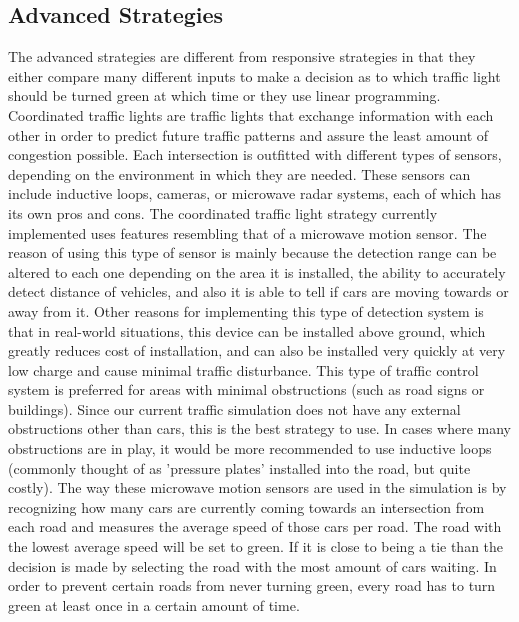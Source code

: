 \documentclass[10pt]{article}
\begin{document}
\subsection{Advanced Strategies}
The advanced strategies are different from responsive strategies in that they either compare many different inputs to make a decision as to which traffic light should be turned green at which time or they use linear programming. Coordinated traffic lights are traffic lights that exchange information with each other in order to predict future traffic patterns and assure the least amount of congestion possible. Each intersection is outfitted with different types of sensors, depending on the environment in which they are needed. These sensors can include inductive loops, cameras, or microwave radar systems, each of which has its own pros and cons. The coordinated traffic light strategy currently implemented uses features resembling that of a microwave motion sensor. The reason of using this type of sensor is mainly because the detection range can be altered to each one depending on the area it is installed, the ability to accurately detect distance of vehicles, and also it is able to tell if cars are moving towards or away from it. Other reasons for implementing this type of detection system is that in real-world situations, this device can be installed above ground, which greatly reduces cost of installation, and can also be installed very quickly at very low charge and cause minimal traffic disturbance. This type of traffic control system is preferred for areas with minimal obstructions (such as road signs or buildings). Since our current traffic simulation does not have any external obstructions other than cars, this is the best strategy to use. In cases where many obstructions are in play, it would be more recommended to use inductive loops (commonly thought of as ’pressure plates’ installed into the road, but quite costly). The way these microwave motion sensors are used in the simulation is by recognizing how many cars are currently coming towards an intersection from each road and measures the average speed of those cars per road. The road with the lowest average speed will be set to green. If it is close to being a tie than the decision is made by selecting the road with the most amount of cars waiting. In order to prevent certain roads from never turning green, every road has to turn green at least once in a certain amount of time. 
\end{document}
